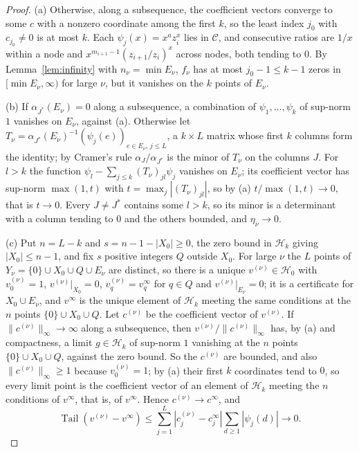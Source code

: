 \documentclass[11pt]{article}
\theoremstyle{definition}
\theoremstyle{plain}
\DeclareMathOperator{\Tail}{Tail}
\begin{document}
\begin{proof}
(a) Otherwise, along a subsequence, the coefficient vectors converge to some
$c$ with a nonzero coordinate among the first $k$, so the least index $j_0$
with $c_{j_0}\ne0$ is at most $k$.  Each $\psi_j(x)=x^az_i^x$ lies in
$\mathcal C$, and consecutive ratios are $1/x$ within a node and
$x^{m_{i+1}-1}(z_{i+1}/z_i)^x$ across nodes, both tending to $0$.  By
Lemma~\ref{lem:infinity} with $n_\nu=\min E_\nu$, $f_\nu$ has at most
$j_0-1\le k-1$ zeros in $[\min E_\nu,\infty)$ for large $\nu$, but it vanishes
on the $k$ points of $E_\nu$.

(b) If $\alpha_{J^*}(E_\nu)=0$ along a subsequence, a combination of
$\psi_1,\ldots,\psi_k$ of sup-norm $1$ vanishes on $E_\nu$, against (a).
Otherwise let $T_\nu=\alpha_{J^*}(E_\nu)^{-1}(\psi_j(e))_{e\in E_\nu,\,j\le L}$,
a $k\times L$ matrix whose first $k$ columns form the identity; by Cramer's
rule $\alpha_J/\alpha_{J^*}$ is the minor of $T_\nu$ on the columns $J$.  For
$l>k$ the function $\psi_l-\sum_{j\le k}(T_\nu)_{jl}\psi_j$ vanishes on
$E_\nu$; its coefficient vector has sup-norm $\max(1,t)$ with
$t=\max_j|(T_\nu)_{jl}|$, so by (a) $t/\max(1,t)\to0$, that is $t\to0$.
Every $J\ne J^*$ contains some $l>k$, so its minor is a determinant with a
column tending to $0$ and the others bounded, and $\eta_\nu\to0$.

(c) Put $n=L-k$ and $s=n-1-|X_0|\ge0$, the zero bound in $\mathcal H_k$
giving $|X_0|\le n-1$, and fix $s$ positive integers $Q$ outside $X_0$.  For
large $\nu$ the $L$ points of $Y_\nu=\{0\}\cup X_0\cup Q\cup E_\nu$ are
distinct, so there is a unique $v^{(\nu)}\in\mathcal H_0$ with
$v^{(\nu)}_0=1$, $v^{(\nu)}|_{X_0}=0$, $v^{(\nu)}_q=v^\infty_q$ for $q\in Q$
and $v^{(\nu)}|_{E_\nu}=0$; it is a certificate for $X_0\cup E_\nu$, and
$v^\infty$ is the unique element of $\mathcal H_k$ meeting the same
conditions at the $n$ points $\{0\}\cup X_0\cup Q$.  Let $c^{(\nu)}$ be the
coefficient vector of $v^{(\nu)}$.  If $\|c^{(\nu)}\|_\infty\to\infty$ along
a subsequence, then $v^{(\nu)}/\|c^{(\nu)}\|_\infty$ has, by (a) and
compactness, a limit $g\in\mathcal H_k$ of sup-norm $1$ vanishing at the $n$
points $\{0\}\cup X_0\cup Q$, against the zero bound.  So the $c^{(\nu)}$ are
bounded, and also $\|c^{(\nu)}\|_\infty\ge1$ because $v^{(\nu)}_0=1$; by (a)
their first $k$ coordinates tend to $0$, so every limit point is the
coefficient vector of an element of $\mathcal H_k$ meeting the $n$ conditions
of $v^\infty$, that is, of $v^\infty$.  Hence $c^{(\nu)}\to c^\infty$, and
\[
  \Tail(v^{(\nu)}-v^\infty)\le\sum_{j=1}^L|c^{(\nu)}_j-c^\infty_j|
  \sum_{d\ge1}|\psi_j(d)|\longrightarrow0 .
\]
\end{proof}
\end{document}
